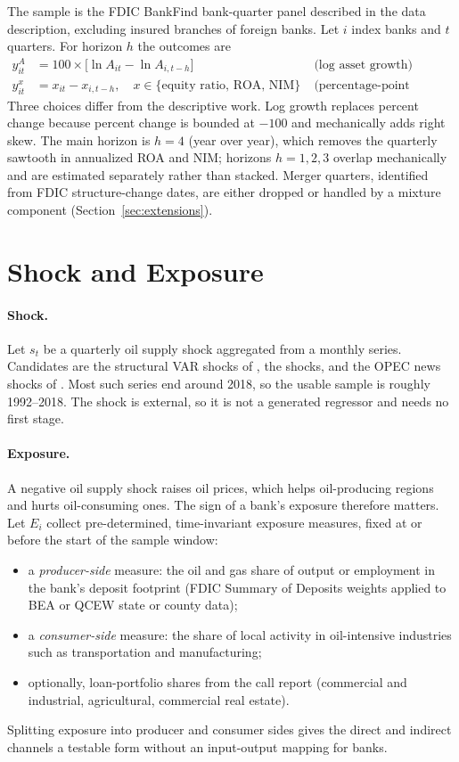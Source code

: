 \documentclass[11pt]{article}
\begin{document}
The sample is the FDIC BankFind bank-quarter panel described in the data description, excluding insured branches of foreign banks. Let $i$ index banks and $t$ quarters. For horizon $h$ the outcomes are
\begin{align*}
  y^{A}_{it} &= 100\times\big[\ln A_{it}-\ln A_{i,t-h}\big] && \text{(log asset growth)}\\
  y^{x}_{it} &= x_{it}-x_{i,t-h}, \quad x\in\{\text{equity ratio, ROA, NIM}\} && \text{(percentage-point change)}
\end{align*}
Three choices differ from the descriptive work. Log growth replaces percent change because percent change is bounded at $-100$ and mechanically adds right skew. The main horizon is $h=4$ (year over year), which removes the quarterly sawtooth in annualized ROA and NIM; horizons $h=1,2,3$ overlap mechanically and are estimated separately rather than stacked. Merger quarters, identified from FDIC structure-change dates, are either dropped or handled by a mixture component (Section~\ref{sec:extensions}).

\section{Shock and Exposure}

\paragraph{Shock.} Let $s_t$ be a quarterly oil supply shock aggregated from a monthly series. Candidates are the structural VAR shocks of \citet{kilian2009}, the \citet{baumeister2019} shocks, and the OPEC news shocks of \citet{kanzig2021}. Most such series end around 2018, so the usable sample is roughly 1992--2018. The shock is external, so it is not a generated regressor and needs no first stage.

\paragraph{Exposure.} A negative oil supply shock raises oil prices, which helps oil-producing regions and hurts oil-consuming ones. The sign of a bank's exposure therefore matters. Let $E_i$ collect pre-determined, time-invariant exposure measures, fixed at or before the start of the sample window:
\begin{itemize}
  \item a \emph{producer-side} measure: the oil and gas share of output or employment in the bank's deposit footprint (FDIC Summary of Deposits weights applied to BEA or QCEW state or county data);
  \item a \emph{consumer-side} measure: the share of local activity in oil-intensive industries such as transportation and manufacturing;
  \item optionally, loan-portfolio shares from the call report (commercial and industrial, agricultural, commercial real estate).
\end{itemize}
Splitting exposure into producer and consumer sides gives the direct and indirect channels a testable form without an input-output mapping for banks.
\end{document}
